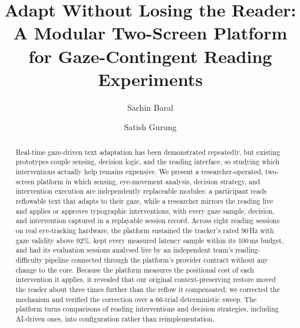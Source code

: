 \documentclass[sigconf,screen]{acmart}
\begin{document}
\title[Adapt Without Losing the Reader]{Adapt Without Losing the Reader: A Modular Two-Screen Platform for Gaze-Contingent Reading Experiments}

\author{Sachin Baral}

\author{Satish Gurung}


\renewcommand{\shortauthors}{Baral and Gurung}

\begin{abstract}
Real-time gaze-driven text adaptation has been demonstrated repeatedly, but existing prototypes couple sensing, decision logic, and the reading interface, so studying which interventions actually help remains expensive.
We present a researcher-operated, two-screen platform in which sensing, eye-movement analysis, decision strategy, and intervention execution are independently replaceable modules: a participant reads reflowable text that adapts to their gaze, while a researcher mirrors the reading live and applies or approves typographic interventions, with every gaze sample, decision, and intervention captured in a replayable session record.
Across eight reading sessions on real eye-tracking hardware, the platform sustained the tracker's rated 90\,Hz with gaze validity above 92\%, kept every measured latency sample within its 100\,ms budget, and had its evaluation sessions analysed live by an independent team's reading-difficulty pipeline connected through the platform's provider contract without any change to the core.
Because the platform measures the positional cost of each intervention it applies, it revealed that our original context-preserving restore moved the reader about three times further than the reflow it compensated; we corrected the mechanism and verified the correction over a 66-trial deterministic sweep.
The platform turns comparisons of reading interventions and decision strategies, including AI-driven ones, into configuration rather than reimplementation.
\end{abstract}
\end{document}
